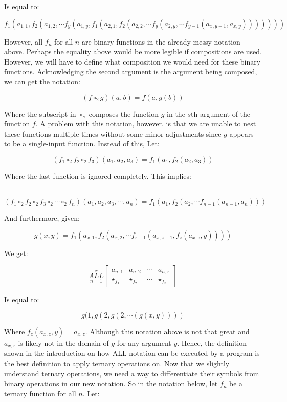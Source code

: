 \documentclass{article}
\begin{document}
Is equal to:

$$f_1(a_{1,1}, f_2(a_{1,2}, \cdots f_y (a_{1,y}, f_1(a_{2,1}, f_2 (a_{2,2}, \cdots f_y(a_{2,y}, \cdots f_{y-1}(a_{x,y-1},a_{x,y} ) ) ) ) ) ) )$$

However, all $f_n$ for all $n$ are binary functions in the already messy notation above. Perhaps the equality above would be more legible if compositions are used. However, we will have to define what composition we would need for these binary functions. Acknowledging the second argument is the argument being composed, we can get the notation:

$$(f \circ_2 g)(a,b)=f(a,g(b))$$

Where the subscript in $\circ_s$ composes the function $g$ in the $s$th argument of the function $f$. A problem with this notation, however, is that we are unable to nest these functions multiple times without some minor adjustments since $g$ appears to be a single-input function. Instead of this, Let:

$$(f_1 \circ_2 f_2 \circ_2 f_3)(a_1,a_2,a_3)=f_1(a_1,f_2(a_2,a_3))$$

Where the last function is ignored completely. This implies:

 $$(f_1 \circ_2 f_2 \circ_2 f_3 \circ_2 \cdots \circ_2 f_n)(a_1,a_2,a_3,\cdots,a_n)=f_1(a_1,f_2(a_2,\cdots f_{n-1}(a_{n-1},a_n)))$$

And furthermore, given:

$$g(x,y)=f_1(a_{x,1},f_2(a_{x,2},\cdots f_{z-1}(a_{x,z-1},f_{z}(a_{x,z},y))))$$

We get:

$$\underset{n=1}{\overset{x}{ALL}} \begin{bmatrix}
a_{n,1} & a_{n,2} & \cdots & a_{n,z} \\
\star_{f_1} & \star_{f_2} & \cdots & \star_{f_z}
\end{bmatrix}$$

Is equal to:

$$g(1,g(2,g(2,\cdots(g(x,y))))$$

Where $f_{z}(a_{x,z},y)=a_{x,z}$. Although this notation above is not that great and $a_{x,z}$ is likely not in the domain of $g$ for any argument $y$. Hence, the definition shown in the introduction on how ALL notation can be executed by a program is the best definition to apply ternary operations on. Now that we slightly understand ternary operations, we need a way to differentiate their symbols from binary operations in our new notation. So in the notation below, let $f_n$ be a ternary function for all $n$. Let:
\end{document}
